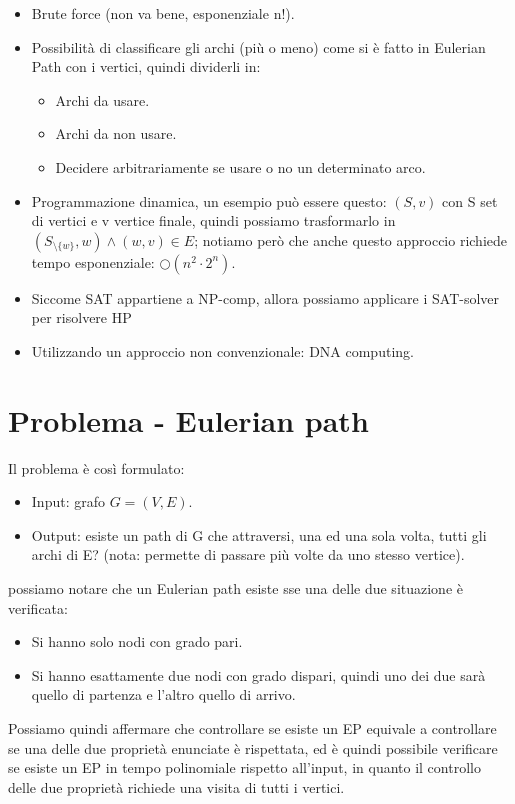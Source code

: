 \documentclass[12pt,a4paper]{article}
\begin{document}
\begin{itemize}
\item Brute force (non va bene, esponenziale n!).
\item Possibilità di classificare gli archi (più o meno) come si è fatto in Eulerian Path con i vertici, quindi dividerli in:
\begin{itemize}
\item Archi da usare.
\item Archi da non usare.
\item Decidere arbitrariamente se usare o no un determinato arco.
\end{itemize}
\item Programmazione dinamica, un esempio può essere questo: $(S, v)$ con S set di vertici e v vertice finale, quindi possiamo trasformarlo in $(S_{\setminus \lbrace w \rbrace}, w) \wedge (w, v) \in E$; notiamo però che anche questo approccio richiede tempo esponenziale: $\bigcirc(n^2 \cdot 2^n)$.
\item Siccome SAT appartiene a NP-comp, allora possiamo applicare i SAT-solver per risolvere HP
\item Utilizzando un approccio non convenzionale: DNA computing.
\end{itemize}

\section{Problema - Eulerian path}
Il problema è così formulato:
\begin{itemize}
\item Input: grafo $G=(V, E)$.
\item Output: esiste un path di G che attraversi, una ed una sola volta, tutti gli archi di E? (nota: permette di passare più volte da uno stesso vertice).
\end{itemize}
possiamo notare che un Eulerian path esiste sse una delle due situazione è verificata:
\begin{itemize}
\item Si hanno solo nodi con grado pari.
\item Si hanno esattamente due nodi con grado dispari, quindi uno dei due sarà quello di partenza e l'altro quello di arrivo.
\end{itemize}
Possiamo quindi affermare che controllare se esiste un EP equivale a controllare se una delle due proprietà enunciate è rispettata, ed è quindi possibile verificare se esiste un EP in tempo polinomiale rispetto all'input, in quanto il controllo delle due proprietà richiede una visita di tutti i vertici.
\end{document}
